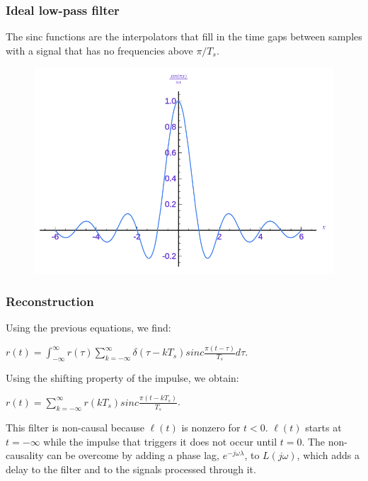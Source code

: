 \begin{frame}
	\frametitle{Ideal low-pass filter}
	The sinc functions are the interpolators that fill in the time gaps between samples with a signal that has no frequencies above $\pi/T_s$.
	\begin{figure}
		\centering
		\includegraphics[width=0.7\linewidth]{sinc}
	\end{figure}
\end{frame}

\begin{frame}
	\frametitle{Reconstruction}
	\begin{block}{}
	Using the previous equations, we find:\\
	\begin{center}
	$r(t)=\int_{-\infty}^{\infty} r(\tau)\sum_{k=-\infty}^{\infty} \delta(\tau-kT_s)sinc\frac{\pi(t-\tau)}{T_s}d\tau.$
	\end{center}
	Using the shifting property of the impulse, we obtain:
	\begin{center}
	${r(t)=\sum_{k=-\infty}^{\infty} r(kT_s)sinc\frac{\pi(t-kT_s)}{T_s}}$.
	\end{center}
	\end{block}
	\begin{alertblock}{}
	This filter is non-causal because $\ell(t)$ is nonzero for $t < 0$. $\ell(t)$ starts at $t=-\infty$ while the impulse that triggers it does not occur until $t=0$. The non-causality can be overcome by adding a phase lag, $e^{-j\omega \lambda}$, to $L(j\omega)$, which adds a delay to the filter and to the signals processed through it.
	\end{alertblock}
\end{frame}

